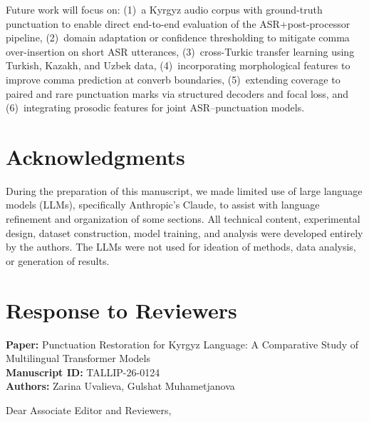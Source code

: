 \documentclass[manuscript, review]{acmart}
\begin{document}
Future work will focus on: (1)~a Kyrgyz audio corpus with ground-truth punctuation to enable direct end-to-end evaluation of the ASR+post-processor pipeline, (2)~domain adaptation or confidence thresholding to mitigate comma over-insertion on short ASR utterances, (3)~cross-Turkic transfer learning using Turkish, Kazakh, and Uzbek data, (4)~incorporating morphological features to improve comma prediction at converb boundaries, (5)~extending coverage to paired and rare punctuation marks via structured decoders and focal loss, and (6)~integrating prosodic features for joint ASR--punctuation models.

\section*{Acknowledgments}
During the preparation of this manuscript, we made limited use of large language models (LLMs), specifically Anthropic's Claude, to assist with language refinement and organization of some sections. All technical content, experimental design, dataset construction, model training, and analysis were developed entirely by the authors. The LLMs were not used for ideation of methods, data analysis, or generation of results.



\clearpage
\appendix
\section*{Response to Reviewers}

\noindent\textbf{Paper:} Punctuation Restoration for Kyrgyz Language: A Comparative Study of Multilingual Transformer Models \\
\noindent\textbf{Manuscript ID:} TALLIP-26-0124 \\
\noindent\textbf{Authors:} Zarina Uvalieva, Gulshat Muhametjanova

\vspace{0.5em}
\noindent Dear Associate Editor and Reviewers,
\end{document}
